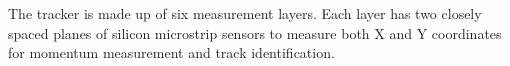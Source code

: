 \documentclass[b1]{sciposter}
\begin{document}
\begin{multicols}{3}



	The tracker is made up of six measurement layers. %
	Each layer has two closely spaced planes of silicon microstrip sensors to measure both X and Y coordinates for momentum measurement and track identification. \cite{Adrian:2015hst}




\end{multicols}
\end{document}
